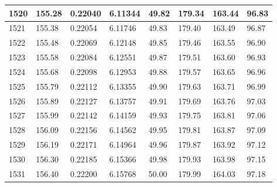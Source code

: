\documentclass[12pt,a4paper,twoside]{article}
\begin{document}
\begin{center}
\begin{longtable}{l l l l | l l l l}
1520 & 155.28 & 0.22040 & 6.11344 & 49.82 & 179.34 & 163.44 & 96.83 \\ \hline
1521 & 155.38 & 0.22054 & 6.11746 & 49.83 & 179.40 & 163.49 & 96.87 \\ \hline
1522 & 155.48 & 0.22069 & 6.12148 & 49.85 & 179.46 & 163.55 & 96.90 \\ \hline
1523 & 155.58 & 0.22084 & 6.12551 & 49.87 & 179.51 & 163.60 & 96.93 \\ \hline
1524 & 155.68 & 0.22098 & 6.12953 & 49.88 & 179.57 & 163.65 & 96.96 \\ \hline
1525 & 155.79 & 0.22112 & 6.13355 & 49.90 & 179.63 & 163.71 & 96.99 \\ \hline
1526 & 155.89 & 0.22127 & 6.13757 & 49.91 & 179.69 & 163.76 & 97.03 \\ \hline
1527 & 155.99 & 0.22142 & 6.14159 & 49.93 & 179.75 & 163.81 & 97.06 \\ \hline
1528 & 156.09 & 0.22156 & 6.14562 & 49.95 & 179.81 & 163.87 & 97.09 \\ \hline
1529 & 156.19 & 0.22171 & 6.14964 & 49.96 & 179.87 & 163.92 & 97.12 \\ \hline
1530 & 156.30 & 0.22185 & 6.15366 & 49.98 & 179.93 & 163.98 & 97.15 \\ \hline
1531 & 156.40 & 0.22200 & 6.15768 & 50.00 & 179.99 & 164.03 & 97.18 \\ \hline

  \end{longtable}
\end{center}
\end{document}
